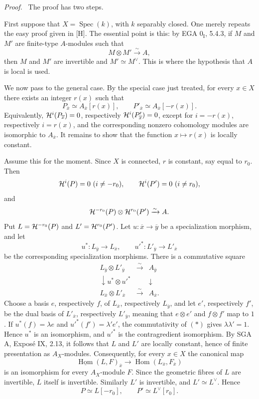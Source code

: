 \documentclass[11pt]{article}
\theoremstyle{plain}
\theoremstyle{definition}
\theoremstyle{remark}
\newenvironment{prooftext}{\par\noindent\textit{Proof.}\ }{\par\medskip}
\DeclareMathOperator{\Spec}{Spec}
\DeclareMathOperator{\Hom}{Hom}
\newcommand{\ol}[1]{\overline{#1}}
\begin{document}
\begin{prooftext}
The proof has two steps.

First suppose that $X=\Spec(k)$, with $k$ separably closed. One merely repeats the easy proof given in [H]. The essential point is this: by EGA $0_{\mathrm I}$, 5.4.3, if $M$ and $M'$ are finite-type $A$-modules such that
\[
   M\otimes M'\xrightarrow{\sim}A,
\]
then $M$ and $M'$ are invertible and $M'\simeq M^\vee$. This is where the hypothesis that $A$ is local is used.

We now pass to the general case. By the special case just treated, for every $x\in X$ there exists an integer $r(x)$ such that
\[
   P_{\ol{x}}\simeq A_{\ol{x}}[r(x)],\qquad
   P'_{\ol{x}}\simeq A_{\ol{x}}[-r(x)].
\]
Equivalently, $\Hh^i(P_{\ol{x}})=0$, respectively $\Hh^i(P'_{\ol{x}})=0$, except for $i=-r(x)$, respectively $i=r(x)$, and the corresponding nonzero cohomology modules are isomorphic to $A_{\ol{x}}$. It remains to show that the function $x\mapsto r(x)$ is locally constant.

Assume this for the moment. Since $X$ is connected, $r$ is constant, say equal to $r_0$. Then
\[
   \mathcal H^i(P)=0\ (i\ne-r_0),\qquad \mathcal H^i(P')=0\ (i\ne r_0),
\]
and
\[
   \mathcal H^{-r_0}(P)\otimes\mathcal H^{r_0}(P')\xrightarrow{\sim}A.
\]
Put $L=\mathcal H^{-r_0}(P)$ and $L'=\mathcal H^{r_0}(P')$. Let $u:\ol{x}\to\ol{y}$ be a specialization morphism, and let
\[
   u^*:L_{\ol{y}}\to L_{\ol{x}},\qquad u'^*:L'_{\ol{y}}\to L'_{\ol{x}}
\]
be the corresponding specialization morphisms. There is a commutative square
\[
\begin{array}{ccc}
L_{\ol{y}}\otimes L'_{\ol{y}} & \xrightarrow{\sim} & A_{\ol{y}}\\
\downarrow {u^*\otimes u'^*} && \downarrow \\
L_{\ol{x}}\otimes L'_{\ol{x}} & \xrightarrow{\sim} & A_{\ol{x}}.
\end{array}\tag{*}
\]
Choose a basis $e$, respectively $f$, of $L_{\ol{x}}$, respectively $L_{\ol{y}}$, and let $e'$, respectively $f'$, be the dual basis of $L'_{\ol{x}}$, respectively $L'_{\ol{y}}$, meaning that $e\otimes e'$ and $f\otimes f'$ map to $1$. If $u^*(f)=\lambda e$ and $u'^*(f')=\lambda'e'$, the commutativity of $(*)$ gives $\lambda\lambda'=1$. Hence $u^*$ is an isomorphism, and $u'^*$ is the contragredient isomorphism. By SGA A, Exposé IX, 2.13, it follows that $L$ and $L'$ are locally constant, hence of finite presentation as $A_X$-modules. Consequently, for every $x\in X$ the canonical map
\[
   \underline{\Hom}(L,F)_{\ol{x}}\longrightarrow\Hom(L_{\ol{x}},F_{\ol{x}})
\]
is an isomorphism for every $A_X$-module $F$. Since the geometric fibres of $L$ are invertible, $L$ itself is invertible. Similarly $L'$ is invertible, and $L'\simeq L^\vee$. Hence
\[
   P\simeq L[-r_0],\qquad P'\simeq L^\vee[r_0].
\]


\end{prooftext}
\end{document}
